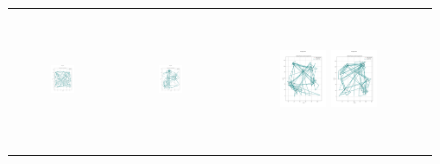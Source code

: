 \begin{figure}[p]
    \centering
    \begin{tabular}{ccc}
         \includegraphics[height=36mm,width=0.24\textwidth]{Images/simulation_no_obs/straight_paths/01.png}
        & \includegraphics[height=36mm,width=0.24\textwidth]{Images/simulation_no_obs/straight_paths/02.png}
        & \includegraphics[height=36mm,width=0.24\textwidth]{Images/simulation_no_obs/straight_paths/03.png}
         \includegraphics[height=36mm,width=0.24\textwidth]{Images/simulation_no_obs/straight_paths/04.png}\\[-4pt]


\end{tabular}
\end{figure}

